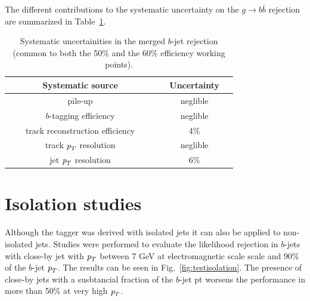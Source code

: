 \vspace{3mm}
The different contributions to the systematic uncertainty on the $g\rightarrow b \bar{b}$ rejection are summarized in Table~\ref{tb:systematics}.
\begin{table}[!hbt] %
\renewcommand{\arraystretch}{1.2}
\centering
\begin{tabular}{ | c | c |}
\hline
  ~~~~~~~Systematic source~~~~~~~ &~~Uncertainty~~\\ \hline
  pile-up          &  neglible     \\ 
  $b$-tagging efficiency     &  neglible     \\ 
  track reconstruction efficiency  &    4\%        \\ 
  track ${\emph{p}_{T}}$ resolution &  neglible     \\
  jet ${\emph{p}_{T}}$ resolution  &    6\%        \\ \hline 
\end{tabular}
\caption{Systematic uncertainities in the merged $b$-jet rejection (common to both the 50\% and the 60\% efficiency working points).}
\label{tb:systematics}
\end{table}


\section{Isolation studies}
Although the tagger was derived with isolated jets it can also be applied to non-isolated jets. Studies were performed to evaluate the likelihood rejection in $b$-jets with close-by jet with ${\emph{p}_{T}}$ between 7 GeV at electromagnetic scale scale and 90$\%$ of the $b$-jet ${\emph{p}_{T}}$. The results can be seen in  Fig.~\ref{fig:testisolation}. The presence of close-by jets with a susbtancial fraction of the $b$-jet pt worsens the performance in more than 50$\%$ at very high ${\emph{p}_{T}}$. 

